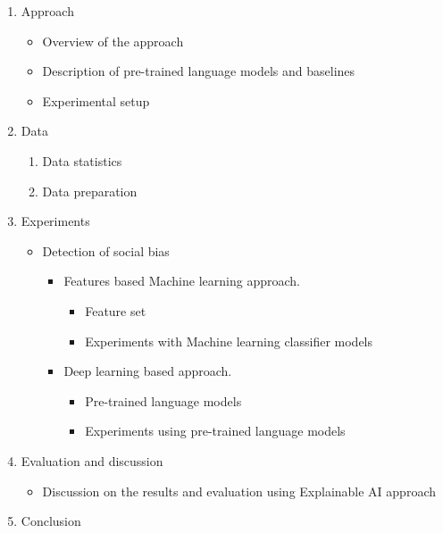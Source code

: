 \begin{enumerate}
\begin{enumerate}
        \end{enumerate}
    \item Approach 
        \begin{itemize}
        \item Overview of the approach
        \item Description of pre-trained language models and baselines
        \item Experimental setup
        \end{itemize} 
    \item Data 
        \begin{enumerate}
            \item Data statistics 
            \item Data preparation 
        \end{enumerate}
    \item Experiments 
        \begin{itemize}
        \item Detection of social bias
            \begin{itemize}
                \item Features based Machine learning approach.
                \begin{itemize}
                    \item Feature set
                    \item Experiments with Machine learning classifier models
                \end{itemize}
                \item Deep learning based approach. 
                 \begin{itemize}
                    \item Pre-trained language models
                    \item Experiments using pre-trained language models
                \end{itemize}
            \end{itemize}
        \end{itemize}
    \item Evaluation and discussion 
        \begin{itemize}
            \item Discussion on the results and evaluation using Explainable AI approach
        \end{itemize}
    \item Conclusion
\end{enumerate}